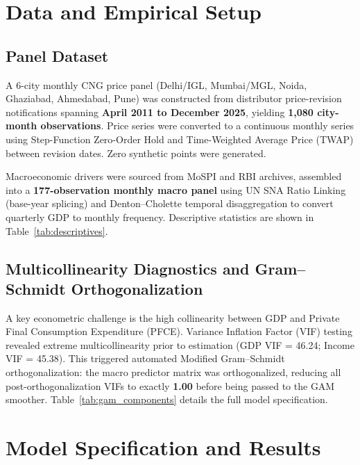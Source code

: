 \documentclass[11pt,a4paper]{article}
\begin{document}
\section{Data and Empirical Setup}

\subsection{Panel Dataset}
A 6-city monthly CNG price panel (Delhi/IGL, Mumbai/MGL, Noida, Ghaziabad, Ahmedabad, Pune) was constructed from distributor price-revision notifications spanning \textbf{April 2011 to December 2025}, yielding \textbf{1,080 city-month observations}. Price series were converted to a continuous monthly series using Step-Function Zero-Order Hold and Time-Weighted Average Price (TWAP) between revision dates. Zero synthetic points were generated.

Macroeconomic drivers were sourced from MoSPI and RBI archives, assembled into a \textbf{177-observation monthly macro panel} using UN SNA Ratio Linking (base-year splicing) and Denton--Cholette temporal disaggregation to convert quarterly GDP to monthly frequency. Descriptive statistics are shown in Table~\ref{tab:descriptives}.



\subsection{Multicollinearity Diagnostics and Gram--Schmidt Orthogonalization}
A key econometric challenge is the high collinearity between GDP and Private Final Consumption Expenditure (PFCE). Variance Inflation Factor (VIF) testing revealed extreme multicollinearity prior to estimation (GDP VIF = 46.24; Income VIF = 45.38). This triggered automated Modified Gram--Schmidt orthogonalization: the macro predictor matrix was orthogonalized, reducing all post-orthogonalization VIFs to exactly \textbf{1.00} before being passed to the GAM smoother. Table~\ref{tab:gam_components} details the full model specification.



\section{Model Specification and Results}
\end{document}
